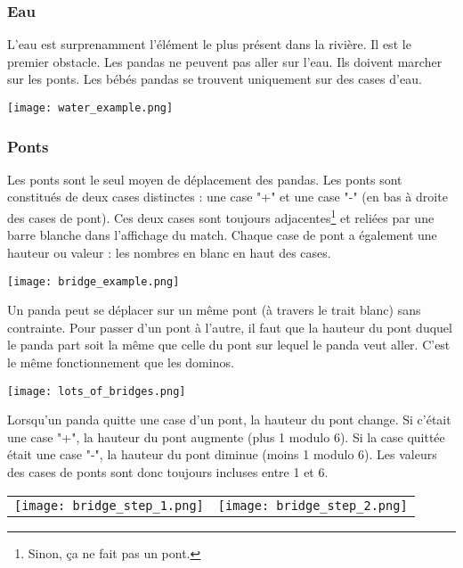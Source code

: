 \newpage

\subsubsection{Eau}
L'eau est surprenamment l'élément le plus présent dans la rivière. Il est le premier obstacle. Les pandas ne peuvent pas aller sur l'eau. Ils doivent marcher sur les ponts. Les bébés pandas se trouvent uniquement sur des cases d'eau.

\begin{center}
    \texttt{[image: water\_example.png]}
\end{center}

\subsubsection{Ponts}
Les ponts sont le seul moyen de déplacement des pandas. Les ponts sont constitués de deux cases distinctes : une case "+" et une case "-" (en bas à droite des cases de pont). Ces deux cases sont toujours adjacentes\footnote{Sinon, ça ne fait pas un pont.} et reliées par une barre blanche dans l'affichage du match. Chaque case de pont a également une hauteur ou valeur : les nombres en blanc en haut des cases.

\begin{center}
    \texttt{[image: bridge\_example.png]}
\end{center}

Un panda peut se déplacer sur un même pont (à travers le trait blanc) sans contrainte. Pour passer d'un pont à l'autre, il faut que la hauteur du pont duquel le panda part soit la même que celle du pont sur lequel le panda veut aller. C'est le même fonctionnement que les dominos.

\begin{center}
    \texttt{[image: lots\_of\_bridges.png]}
\end{center}

Lorsqu'un panda quitte une case d'un pont, la hauteur du pont change. Si c'était une case "+", la hauteur du pont augmente (plus 1 modulo 6). Si la case quittée était une case "-", la hauteur du pont diminue (moins 1 modulo 6). Les valeurs des cases de ponts sont donc toujours incluses entre 1 et 6.

\begin{center}
\begin{tabular}{c c}
     \texttt{[image: bridge\_step\_1.png]} & \texttt{[image: bridge\_step\_2.png]} \\
\end{tabular}
\end{center}

